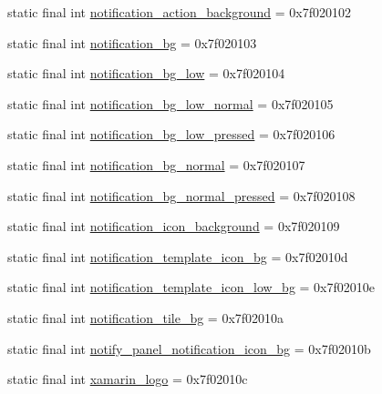 \begin{CompactItemize}
static final int \hyperlink{classandroid_1_1support_1_1v7_1_1cardview_1_1_r_1_1drawable_9231e44d6e87550f4ac081d9f4adb2d3}{notification\_\-action\_\-background} = 0x7f020102
\item 
static final int \hyperlink{classandroid_1_1support_1_1v7_1_1cardview_1_1_r_1_1drawable_749a3b40bb2306ae05741a201d53b24c}{notification\_\-bg} = 0x7f020103
\item 
static final int \hyperlink{classandroid_1_1support_1_1v7_1_1cardview_1_1_r_1_1drawable_d48a49c400f588ff2e9e49c8c5c39113}{notification\_\-bg\_\-low} = 0x7f020104
\item 
static final int \hyperlink{classandroid_1_1support_1_1v7_1_1cardview_1_1_r_1_1drawable_cb28b6051b3e2008beaae007a06ace85}{notification\_\-bg\_\-low\_\-normal} = 0x7f020105
\item 
static final int \hyperlink{classandroid_1_1support_1_1v7_1_1cardview_1_1_r_1_1drawable_f06c7cfc3298385a97023f4bc09e17d1}{notification\_\-bg\_\-low\_\-pressed} = 0x7f020106
\item 
static final int \hyperlink{classandroid_1_1support_1_1v7_1_1cardview_1_1_r_1_1drawable_aa23abf5d3144aad5be73803a2239110}{notification\_\-bg\_\-normal} = 0x7f020107
\item 
static final int \hyperlink{classandroid_1_1support_1_1v7_1_1cardview_1_1_r_1_1drawable_c2e2bd8beed0922ecee35d0e2bfff7fc}{notification\_\-bg\_\-normal\_\-pressed} = 0x7f020108
\item 
static final int \hyperlink{classandroid_1_1support_1_1v7_1_1cardview_1_1_r_1_1drawable_ad2b3579a0511ebb57d724d1dce957ff}{notification\_\-icon\_\-background} = 0x7f020109
\item 
static final int \hyperlink{classandroid_1_1support_1_1v7_1_1cardview_1_1_r_1_1drawable_a94de1d2c8450477f2734db346dc5556}{notification\_\-template\_\-icon\_\-bg} = 0x7f02010d
\item 
static final int \hyperlink{classandroid_1_1support_1_1v7_1_1cardview_1_1_r_1_1drawable_5284cba092c1010b1dbc197836a44bd2}{notification\_\-template\_\-icon\_\-low\_\-bg} = 0x7f02010e
\item 
static final int \hyperlink{classandroid_1_1support_1_1v7_1_1cardview_1_1_r_1_1drawable_35e4c99c5bc567956da6d93ab85bbad6}{notification\_\-tile\_\-bg} = 0x7f02010a
\item 
static final int \hyperlink{classandroid_1_1support_1_1v7_1_1cardview_1_1_r_1_1drawable_17ffef0e9aa6633055aa1c972d688e71}{notify\_\-panel\_\-notification\_\-icon\_\-bg} = 0x7f02010b
\item 
static final int \hyperlink{classandroid_1_1support_1_1v7_1_1cardview_1_1_r_1_1drawable_2f1a73543f1cc736fa86d4af7ded11fa}{xamarin\_\-logo} = 0x7f02010c
\end{CompactItemize}


